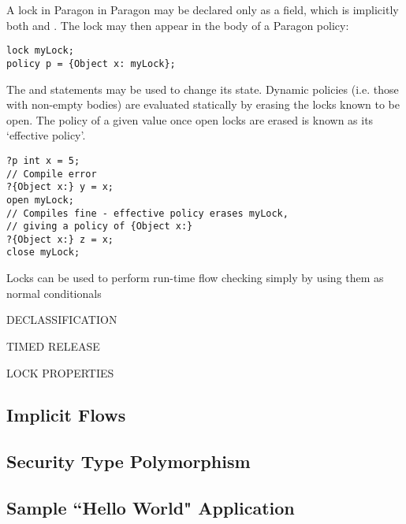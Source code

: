A lock in Paragon in Paragon may be declared only as a field, which is implicitly both  and . The lock may then appear in the body of a Paragon policy:

\begin{verbatim}
lock myLock;
policy p = {Object x: myLock};
\end{verbatim}

The  and  statements may be used to change its state. Dynamic policies (i.e. those with non-empty bodies) are evaluated statically by erasing the locks known to be open. The policy of a given value once open locks are erased is known as its `effective policy'.

\begin{verbatim}
?p int x = 5;
// Compile error
?{Object x:} y = x;
open myLock;
// Compiles fine - effective policy erases myLock,
// giving a policy of {Object x:}
?{Object x:} z = x;
close myLock;
\end{verbatim}

Locks can be used to perform run-time flow checking simply by using them as normal conditionals

DECLASSIFICATION

TIMED RELEASE

LOCK PROPERTIES

\subsection{Implicit Flows}

\subsection{Security Type Polymorphism} \label{para_generics}

\subsection{Sample ``Hello World" Application}